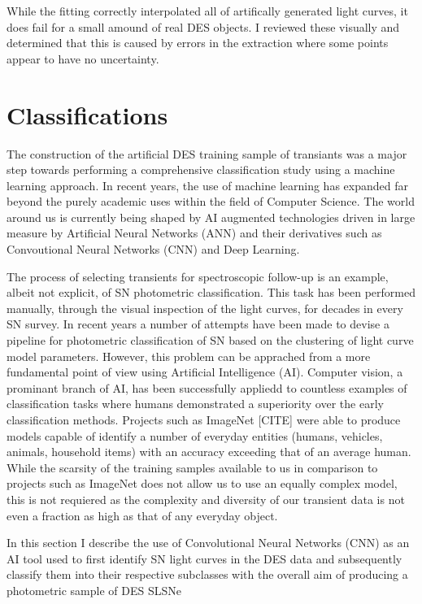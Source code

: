 While the fitting correctly interpolated all of artifically generated light curves, it does fail for a small amound of real DES objects. I reviewed these visually and determined that this is caused by errors in the extraction where some points appear to have no uncertainty.

\section{Classifications} \label{sec:CNN}
The construction of the artificial DES training sample of transiants was a major step towards performing a comprehensive classification study using a machine learning approach. In recent years, the use of machine learning has expanded far beyond the purely academic uses within the field of Computer Science. The world around us is currently being shaped by AI augmented technologies driven in large measure by Artificial Neural Networks (ANN) and their derivatives such as Convoutional Neural Networks (CNN) and Deep Learning.

The process of selecting transients for spectroscopic follow-up is an example, albeit not explicit, of SN photometric classification. This task has been performed manually, through the visual inspection of the light curves, for decades in every SN survey. In recent years a number of attempts have been made to devise a pipeline for photometric classification of SN based on the clustering of light curve model parameters. However, this problem can be apprached from a more fundamental point of view using Artificial Intelligence (AI). Computer vision, a prominant branch of AI, has been successfully appliedd to countless examples of classification tasks where humans demonstrated a superiority over the early classification methods. Projects such as ImageNet [CITE] were able to produce models capable of identify a number of everyday entities (humans, vehicles, animals, household items) with an accuracy exceeding that of an average human. While the scarsity of the training samples available to us in comparison to projects such as ImageNet does not allow us to use an equally complex model, this is not requiered as the complexity and diversity of our transient data is not even a fraction as high as that of any everyday object.

In this section I describe the use of Convolutional Neural Networks (CNN) as an AI tool used to first identify SN light curves in the DES data and subsequently classify them into their respective subclasses with the overall aim of producing a photometric sample of DES SLSNe

